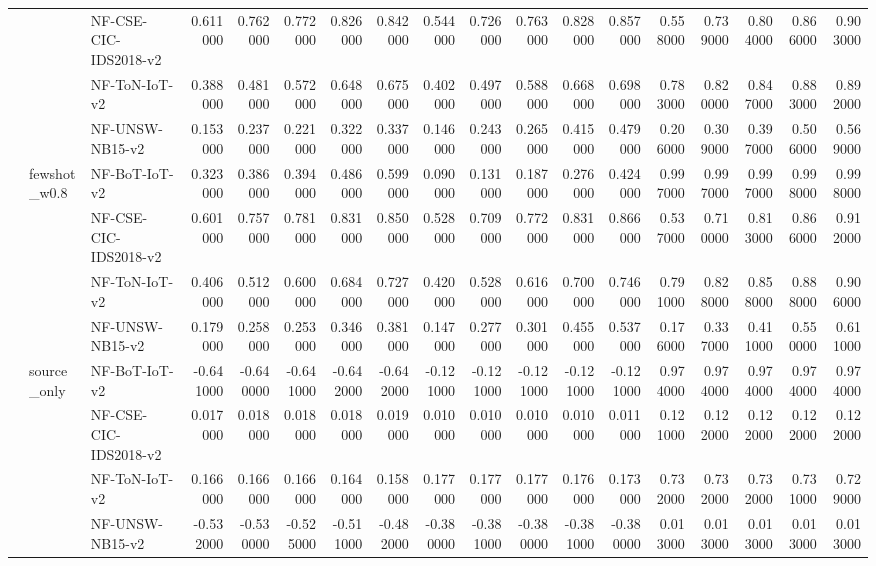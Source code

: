 \begin{tabular}{lllrrrrrrrrrrrrrrr}
 &  & NF-CSE-CIC-IDS2018-v2 & 0.611000 & 0.762000 & 0.772000 & 0.826000 & 0.842000 & 0.544000 & 0.726000 & 0.763000 & 0.828000 & 0.857000 & 0.558000 & 0.739000 & 0.804000 & 0.866000 & 0.903000 \\
 &  & NF-ToN-IoT-v2 & 0.388000 & 0.481000 & 0.572000 & 0.648000 & 0.675000 & 0.402000 & 0.497000 & 0.588000 & 0.668000 & 0.698000 & 0.783000 & 0.820000 & 0.847000 & 0.883000 & 0.892000 \\
 &  & NF-UNSW-NB15-v2 & 0.153000 & 0.237000 & 0.221000 & 0.322000 & 0.337000 & 0.146000 & 0.243000 & 0.265000 & 0.415000 & 0.479000 & 0.206000 & 0.309000 & 0.397000 & 0.506000 & 0.569000 \\
\cline{2-18}
 & \multirow[t]{4}{*}{fewshot_w0.8} & NF-BoT-IoT-v2 & 0.323000 & 0.386000 & 0.394000 & 0.486000 & 0.599000 & 0.090000 & 0.131000 & 0.187000 & 0.276000 & 0.424000 & 0.997000 & 0.997000 & 0.997000 & 0.998000 & 0.998000 \\
 &  & NF-CSE-CIC-IDS2018-v2 & 0.601000 & 0.757000 & 0.781000 & 0.831000 & 0.850000 & 0.528000 & 0.709000 & 0.772000 & 0.831000 & 0.866000 & 0.537000 & 0.710000 & 0.813000 & 0.866000 & 0.912000 \\
 &  & NF-ToN-IoT-v2 & 0.406000 & 0.512000 & 0.600000 & 0.684000 & 0.727000 & 0.420000 & 0.528000 & 0.616000 & 0.700000 & 0.746000 & 0.791000 & 0.828000 & 0.858000 & 0.888000 & 0.906000 \\
 &  & NF-UNSW-NB15-v2 & 0.179000 & 0.258000 & 0.253000 & 0.346000 & 0.381000 & 0.147000 & 0.277000 & 0.301000 & 0.455000 & 0.537000 & 0.176000 & 0.337000 & 0.411000 & 0.550000 & 0.611000 \\
\cline{2-18}
 & \multirow[t]{4}{*}{source_only} & NF-BoT-IoT-v2 & -0.641000 & -0.640000 & -0.641000 & -0.642000 & -0.642000 & -0.121000 & -0.121000 & -0.121000 & -0.121000 & -0.121000 & 0.974000 & 0.974000 & 0.974000 & 0.974000 & 0.974000 \\
 &  & NF-CSE-CIC-IDS2018-v2 & 0.017000 & 0.018000 & 0.018000 & 0.018000 & 0.019000 & 0.010000 & 0.010000 & 0.010000 & 0.010000 & 0.011000 & 0.121000 & 0.122000 & 0.122000 & 0.122000 & 0.122000 \\
 &  & NF-ToN-IoT-v2 & 0.166000 & 0.166000 & 0.166000 & 0.164000 & 0.158000 & 0.177000 & 0.177000 & 0.177000 & 0.176000 & 0.173000 & 0.732000 & 0.732000 & 0.732000 & 0.731000 & 0.729000 \\
 &  & NF-UNSW-NB15-v2 & -0.532000 & -0.530000 & -0.525000 & -0.511000 & -0.482000 & -0.380000 & -0.381000 & -0.380000 & -0.381000 & -0.380000 & 0.013000 & 0.013000 & 0.013000 & 0.013000 & 0.013000 \\

\end{tabular}
